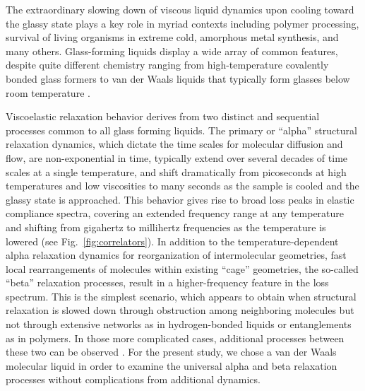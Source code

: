 \documentclass[reprint,showpacs,amsmath,amssymb,aip,jcp]{revtex4-1}
\begin{document}
The extraordinary slowing down of viscous liquid dynamics upon cooling
toward the glassy state plays a key role in myriad contexts including
polymer processing, survival of living organisms in extreme cold,
amorphous metal synthesis, and many others. Glass-forming liquids
display a wide array of common features, despite quite different
chemistry ranging from high-temperature covalently bonded glass
formers to van der Waals liquids that typically form glasses below
room temperature \cite{Kauzmann1948, Angell1995, Debenedetti1996,
  Dyre2006, Roland2010, Berthier2011}.

Viscoelastic relaxation behavior derives from two distinct and
sequential processes common to all glass forming liquids. The primary
or ``alpha'' structural relaxation dynamics, which dictate the time
scales for molecular diffusion and flow, are non-exponential in time,
typically extend over several decades of time scales at a single
temperature, and shift dramatically from picoseconds at high
temperatures and low viscosities to many seconds as the sample is
cooled and the glassy state is approached. This behavior gives rise to
broad loss peaks in elastic compliance spectra, covering an extended
frequency range at any temperature and shifting from gigahertz to
millihertz frequencies as the temperature is lowered (see
Fig.~\ref{fig:correlators}). In addition to the temperature-dependent
alpha relaxation dynamics for reorganization of intermolecular
geometries, fast local rearrangements of molecules within existing
``cage'' geometries, the so-called ``beta'' relaxation processes,
result in a higher-frequency feature in the loss spectrum. This is the
simplest scenario, which appears to obtain when structural relaxation
is slowed down through obstruction among neighboring molecules but not
through extensive networks as in hydrogen-bonded liquids or
entanglements as in polymers. In those more complicated cases,
additional processes between these two can be observed
\cite{Johari1970,Johari1982}. For the present study, we chose a van
der Waals molecular liquid in order to examine the universal alpha and
beta relaxation processes without complications from additional
dynamics.
\end{document}
